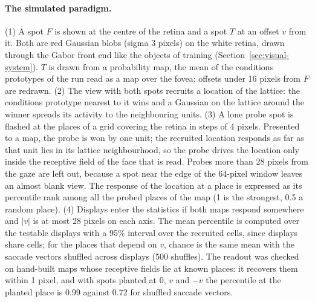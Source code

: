 \documentclass[14pt]{article}
\begin{document}
\paragraph{The simulated paradigm.}
(1) A spot $F$ is shown at the centre of the retina and a spot $T$ at an offset $v$ from it.
Both are red Gaussian blobs (sigma 3 pixels) on the white retina, drawn through the Gabor front end like the objects of training (Section~\ref{sec:visual-system}).
$T$ is drawn from a probability map, the mean of the conditions prototypes of the run read as a map over the fovea; offsets under 16 pixels from $F$ are redrawn.
(2) The view with both spots recruits a location of the lattice: the conditions prototype nearest to it wins and a Gaussian on the lattice around the winner spreads its activity to the neighbouring units.
(3) A lone probe spot is flashed at the places of a grid covering the retina in steps of 4 pixels.
Presented to a map, the probe is won by one unit; the recruited location responds as far as that unit lies in its lattice neighbourhood, so the probe drives the location only inside the receptive field of the face that is read.
Probes more than 28 pixels from the gaze are left out, because a spot near the edge of the 64-pixel window leaves an almost blank view.
The response of the location at a place is expressed as its percentile rank among all the probed places of the map (1 is the strongest, 0.5 a random place).
(4) Displays enter the statistics if both maps respond somewhere and $|v|$ is at most 28 pixels on each axis.
The mean percentile is computed over the testable displays with a 95\% interval over the recruited cells, since displays share cells; for the places that depend on $v$, chance is the same mean with the saccade vectors shuffled across displays (500 shuffles).
The readout was checked on hand-built maps whose receptive fields lie at known places: it recovers them within 1 pixel, and with spots planted at $0$, $v$ and $-v$ the percentile at the planted place is 0.99 against 0.72 for shuffled saccade vectors.
\end{document}
